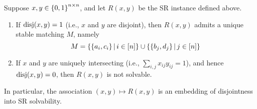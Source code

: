 \begin{prop}
    \label{prop:embedding}
    Suppose $x, y \in \left\{0, 1\right\}^{n \times n}$, and let $R(x, y)$ be the SR instance defined above. 
    \begin{enumerate}
        \item If $\operatorname{disj}(x, y) = 1$ (i.e., $x$ and $y$ are disjoint), then $R(x, y)$ admits a unique stable matching $M$, namely 
        \begin{equation}
            M = \left\{\left\{a_i, c_i\right\} \,\middle |\, i \in [n]\right\} \cup \left\{\left\{b_j, d_j\right\} \,\middle |\, j \in [n]\right\}
        \end{equation}
        \item If $x$ and $y$ are uniquely intersecting (i.e., $\sum_{i,j} x_{ij} y_{ij} = 1$), and hence $\operatorname{disj}(x, y) = 0$, then $R(x, y)$ is not solvable.
    \end{enumerate}
    In particular, the association $(x, y) \mapsto R(x, y)$ is an embedding of disjointness into SR solvability.
\end{prop}

